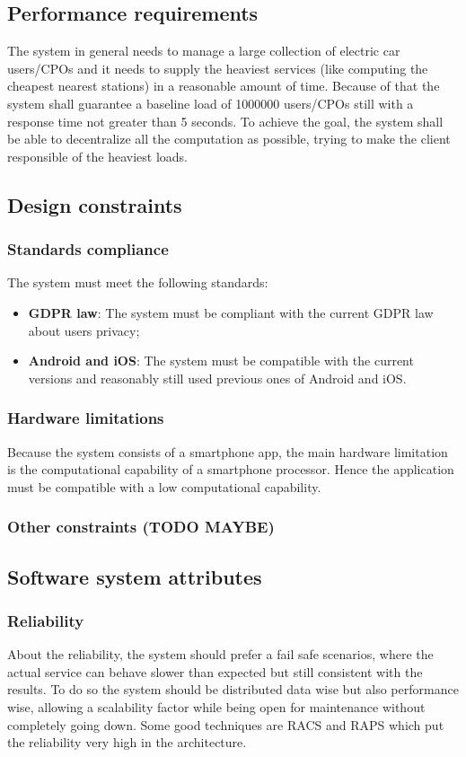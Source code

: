\clearpage
\subsection{Performance requirements}
The system in general needs to manage a large collection of electric car users/\acp{CPO} and it needs to supply the heaviest services (like computing the cheapest nearest stations) in a reasonable amount of time.
Because of that the system shall guarantee a baseline load of 1000000 users/\acp{CPO} still with a response time not greater than 5 seconds. To achieve the goal, the system shall be able to decentralize all the computation as possible,
trying to make the client responsible of the heaviest loads.
\subsection{Design constraints}
\subsubsection{Standards compliance}
The system must meet the following standards:
\begin{itemize}
    \item \textbf{\ac{GDPR} law}: The system must be compliant with the current GDPR law about users privacy;
    \item \textbf{Android and iOS}: The system must be compatible with the current versions and reasonably still used previous ones of Android and iOS.
\end{itemize}
\subsubsection{Hardware limitations}
Because the system consists of a smartphone app, the main hardware limitation is the computational capability of a smartphone processor. Hence the
application must be compatible with a low computational capability.
\subsubsection{Other constraints (TODO MAYBE)}

\subsection{Software system attributes}
\subsubsection{Reliability}
About the reliability, the system should prefer a fail safe scenarios, where the actual service can behave slower than expected but still consistent with the results.
To do so the system should be distributed data wise but also performance wise, allowing a scalability factor while being open for maintenance without completely going down.
Some good techniques are \ac{RACS} and \ac{RAPS} which put the reliability very high in the architecture.
